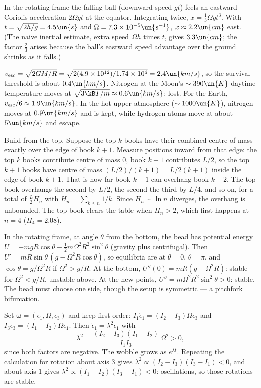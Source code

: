  In the rotating frame the falling ball (downward speed $gt$) feels an eastward Coriolis acceleration $2\Omega gt$ at the equator. Integrating twice, $x = \tfrac13\Omega gt^3$. With $t = \sqrt{2h/g} = 4.5\un{s}$ and $\Omega = 7.3\times10^{-5}\un{s^{-1}}$, $x\approx2.2\un{cm}$ east. (The naive inertial estimate, extra speed $\Omega h$ times $t$, gives $3.3\un{cm}$; the factor $\tfrac23$ arises because the ball's eastward speed advantage over the ground shrinks as it falls.)

 $v_{\text{esc}} = \sqrt{2GM/R} = \sqrt{2(4.9\times10^{12})/1.74\times10^6} = 2.4\un{km/s}$, so the survival threshold is about $0.4\un{km/s}$. Nitrogen at the Moon's $\sim390\un{K}$ daytime temperature moves at $\sqrt{3\kB T/m}\approx0.6\un{km/s}$: lost. For the Earth, $v_{\text{esc}}/6\approx1.9\un{km/s}$. In the hot upper atmosphere ($\sim1000\un{K}$), nitrogen moves at $0.9\un{km/s}$ and is kept, while hydrogen atoms move at about $5\un{km/s}$ and escape.

 Build from the top. Suppose the top $k$ books have their combined centre of mass exactly over the edge of book $k+1$. Measure positions inward from that edge: the top $k$ books contribute centre of mass $0$, book $k+1$ contributes $L/2$, so the top $k+1$ books have centre of mass $(L/2)/(k+1) = L/2(k+1)$ inside the edge of book $k+1$. That is how far book $k+1$ can overhang book $k+2$. The top book overhangs the second by $L/2$, the second the third by $L/4$, and so on, for a total of $\tfrac L2H_n$ with $H_n = \sum_{k\le n}1/k$. Since $H_n\sim\ln n$ diverges, the overhang is unbounded. The top book clears the table when $H_n>2$, which first happens at $n = 4$ ($H_4 = 2.08$).

 In the rotating frame, at angle $\theta$ from the bottom, the bead has potential energy $U = -mgR\cos\theta - \tfrac12m\Omega^2R^2\sin^2\theta$ (gravity plus centrifugal). Then $U' = mR\sin\theta\,(g - \Omega^2R\cos\theta)$, so equilibria are at $\theta = 0$, $\theta = \pi$, and $\cos\theta = g/\Omega^2R$ if $\Omega^2>g/R$. At the bottom, $U''(0) = mR(g - \Omega^2R)$: stable for $\Omega^2<g/R$, unstable above. At the new points, $U'' = m\Omega^2R^2\sin^2\theta>0$: stable. The bead must choose one side, though the setup is symmetric --- a pitchfork bifurcation.

 Set $\boldsymbol\omega = (\epsilon_1, \Omega, \epsilon_3)$ and keep first order: $I_1\dot\epsilon_1 = (I_2-I_3)\Omega\epsilon_3$ and $I_3\dot\epsilon_3 = (I_1-I_2)\Omega\epsilon_1$. Then $\ddot\epsilon_1 = \lambda^2\epsilon_1$ with
\[
  \lambda^2 = \frac{(I_2-I_3)(I_1-I_2)}{I_1I_3}\,\Omega^2 > 0,
\]
since both factors are negative. The wobble grows as $e^{\lambda t}$. Repeating the calculation for rotation about axis $3$ gives $\lambda^2\propto(I_2 - I_3)(I_3 - I_1)<0$, and about axis $1$ gives $\lambda^2\propto(I_1-I_2)(I_3-I_1)<0$: oscillations, so those rotations are stable.
